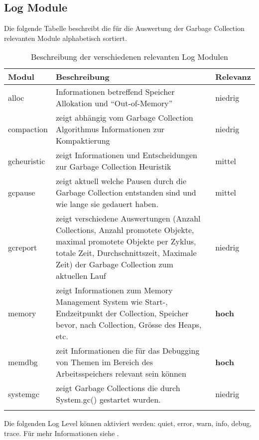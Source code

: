 \subsection{Log Module}\label{logmodule}

Die folgende Tabelle beschreibt die für die Auswertung der Garbage Collection relevanten Module alphabetisch sortiert. 

\begin{longtable}{|p{4cm}|p{9cm}|p{2cm}|}
  \hline
  \textbf{Modul} & \textbf{Beschreibung} & \textbf{Relevanz}\\\hline
  alloc & Informationen betreffend Speicher Allokation und ``Out-of-Memory'' & niedrig \\\hline
  compaction & zeigt abhängig vom Garbage Collection Algorithmus Informationen zur Kompaktierung& niedrig \\\hline
  gcheuristic & zeigt Informationen und Entscheidungen zur Garbage Collection Heuristik & mittel \\\hline
  gcpause & zeigt aktuell welche Pausen durch die Garbage Collection entstanden sind und wie lange sie gedauert haben. & mittel \\\hline
  gcreport & zeigt verschiedene Auswertungen (Anzahl Collections, Anzahl promotete Objekte, maximal promotete Objekte per Zyklus, totale Zeit, Durchschnittszeit, Maximale Zeit) der Garbage Collection zum aktuellen Lauf& niedrig \\\hline
  memory & zeigt Informationen zum Memory Management System wie Start-, Endzeitpunkt der Collection, Speicher bevor, nach Collection, Grösse des Heaps, etc.& \textbf{hoch} \\\hline
  memdbg & zeit Informationen die für das Debugging von Themen im Bereich des Arbeitsspeichers relevant sein können& \textbf{hoch} \\\hline
  systemgc & zeigt Garbage Collections die durch System.gc() gestartet wurden. & niedrig \\\hline
    \caption{Beschreibung der verschiedenen relevanten Log Modulen}
\end{longtable}

Die folgenden Log Level können aktiviert werden: quiet, error, warn, info, debug, trace. Für mehr Informationen siehe \cite{oracleJRockitR28CLR}.
